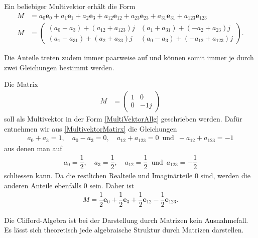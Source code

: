 \begin{hilfssatz}
	Ein beliebiger Multivektor erhält die Form
	\begin{align} \label{MultiVektorAllg}
		M &= a_0\mathbf{e}_0 + a_1\mathbf{e}_1 + a_2\mathbf{e}_3 + a_{12}\mathbf{e}_{12} + a_{23}\mathbf{e}_{23} + a_{31}\mathbf{e}_{31} + a_{123}\mathbf{e}_{123}\\
		M &=
		\begin{pmatrix}
			(a_0+a_3) + (a_{12}+a_{123})j & (a_1+a_{31})+(-a_2+a_{23})j \\
			(a_1-a_{31})+(a_2+a_{23})j & (a_0-a_3)+(-a_{12}+a_{123})j
		\end{pmatrix}.\label{MultivektorMatirx}
	\end{align}
\end{hilfssatz}
Die Anteile treten zudem immer paarweise auf und können somit immer je durch zwei Gleichungen bestimmt werden.
\begin{beispiel}
	Die Matrix
	\begin{align}
		M &= 
		\begin{pmatrix}
			1 & 0 \\
			0 & -1j
		\end{pmatrix}
	\end{align}
	soll als Multivektor in der Form \eqref{MultiVektorAllg} geschrieben werden. Dafür entnehmen wir aus \eqref{MultivektorMatirx} die Gleichungen
	\begin{align}
		a_0 + a_3 = 1,\quad a_0 - a_3 = 0,\quad a_{12}+a_{123} = 0\enspace\text{und}\enspace -a_{12}+a_{123}=-1
	\end{align}
	aus denen man auf
	\begin{align}
		a_0 = \dfrac{1}{2},\quad a_3 = \dfrac{1}{2},\quad a_{12}=\dfrac{1}{2}\enspace\text{und}\enspace a_{123}=-\dfrac{1}{2}
	\end{align}
	schliessen kann. Da die restlichen Realteile und Imaginärteile 0 sind, werden die anderen Anteile ebenfalls 0 sein. Daher ist
	\begin{align}
		M = \dfrac{1}{2} \mathbf{e}_0+ \dfrac{1}{2} \mathbf{e}_3 + \dfrac{1}{2} \mathbf{e}_{12} - \dfrac{1}{2} \mathbf{e}_{123}.
	\end{align}
\end{beispiel}
Die Clifford-Algebra ist bei der Darstellung durch Matrizen kein Ausnahmefall. Es lässt sich theoretisch jede algebraische Struktur durch Matrizen darstellen.